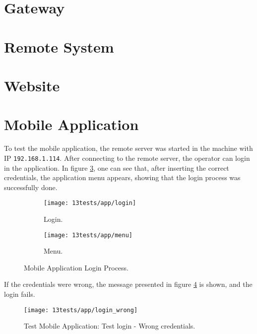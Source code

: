 \section{Gateway}
\section{Remote System}
\section{Website}


\clearpage
\section{Mobile Application}

To test the mobile application, the remote server was started in the machine with IP \verb|192.168.1.114|. After connecting to the remote server, the operator can login in the application. In figure \ref{fig:applogin}, one can see that, after inserting the correct credentials, the application menu appears, showing that the login process was successfully done.

\begin{figure}[H]
	\centering
	\begin{subfigure}{.4\textwidth}
		\centering
		\texttt{[image: 13tests/app/login]}
		\caption{Login.}
		\label{fig:login}
	\end{subfigure}%
	\begin{subfigure}{.4\textwidth}
		\centering
		\texttt{[image: 13tests/app/menu]}
		\caption{Menu.}
		\label{fig:menu}
	\end{subfigure}
	\caption{Mobile Application Login Process.}
	\label{fig:applogin}
\end{figure}

If the credentials were wrong, the message presented in figure \ref{fig:login_wrong} is shown, and the login fails.

\begin{figure}[H]
	\centering	
	\texttt{[image: 13tests/app/login\_wrong]}
	\caption{Test Mobile Application: Test login - Wrong credentials.}
	\label{fig:login_wrong}
\end{figure}

